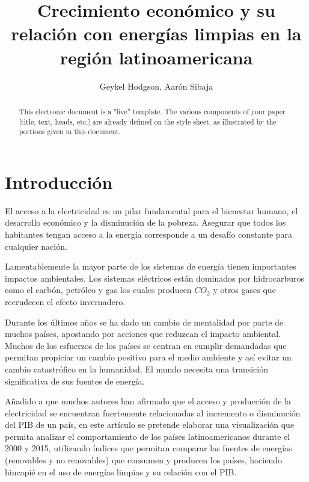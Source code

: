 \documentclass[spanish, letterpaper, 12 pt, conference]{ieeeconf}  %
\title{\LARGE \bf
Crecimiento económico y su relación con energías limpias en la región latinoamericana
}
\author{Geykel Hodgson, Aarón Sibaja }
\begin{document}
\maketitle
\thispagestyle{empty}
\pagestyle{empty}


\begin{abstract}

This electronic document is a "live'' template. The various components of your paper [title, text, heads, etc.] are already defined on the style sheet, as illustrated by the portions given in this document.

\end{abstract}


\section{Introducción}

El acceso a la electricidad es un pilar fundamental para el bienestar humano, el desarrollo económico y la disminución de la pobreza. Asegurar que todos los habitantes tengan acceso a la energía corresponde a un desafío constante para cualquier nación.

Lamentablemente la mayor parte de los sistemas de energía tienen importantes impactos ambientales. Los sistemas eléctricos están dominados por hidrocarburos  como el carbón, petróleo y gas los cuales producen $CO_2$ y otros gases que recrudecen el efecto invernadero. 

Durante los últimos años se ha dado un cambio de mentalidad por parte de muchos países, apostando por acciones que reduzcan el impacto ambiental. Muchos de los esfuerzos de los países se centran en  cumplir demandadas que permitan propiciar un cambio positivo para el medio ambiente y así evitar un cambio catastrófico en la humanidad. El mundo necesita una transición significativa  de sus fuentes de energía.

Añadido a que muchos autores han afirmado que el acceso y producción de la electricidad se encuentran fuertemente relacionadas al incremento o disminución del PIB de un país, en este artículo se pretende elaborar una visualización que permita analizar el comportamiento de los países latinoamericanos durante el 2000 y 2015, utilizando índices que permitan comparar las fuentes de energías (renovables y no renovables) que consumen y producen  los países, haciendo hincapié en el uso de energías limpias y su relación con el PIB.
\end{document}
